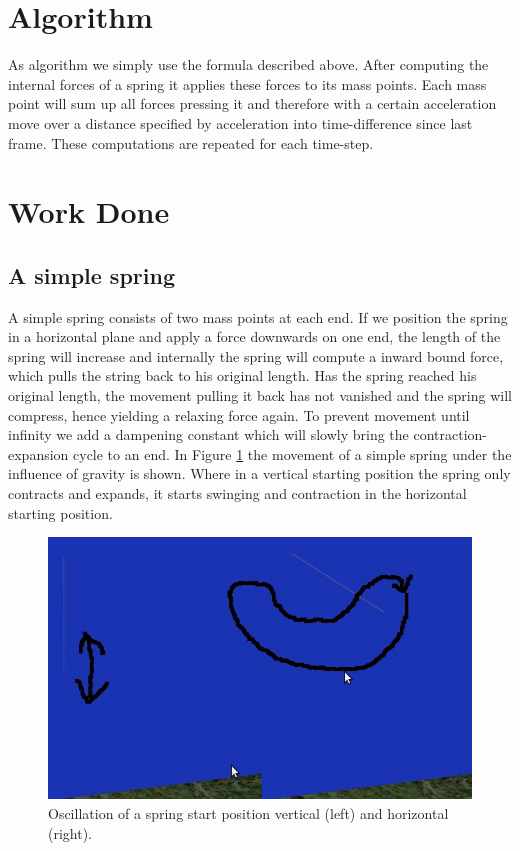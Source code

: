 \documentclass[11pt]{article}
\begin{document}
\section{Algorithm}
As algorithm we simply use the formula described above. After computing the internal forces of a spring it applies these forces to its mass points. Each mass point will sum up all forces pressing it and therefore with a certain acceleration move over a distance specified by acceleration into time-difference since last frame. These computations are repeated for each time-step.

\section{Work Done}
\subsection{A simple spring}
A simple spring consists of two mass points at each end. If we position the spring in a horizontal plane and apply a force downwards on one end, the length of the spring will increase and internally the spring will compute a inward bound force, which pulls the string back to his original length. Has the spring reached his original length, the movement pulling it back has not vanished and the spring will compress, hence yielding a relaxing force again. To prevent movement until infinity we add a dampening constant which will slowly bring the contraction-expansion cycle to an end. In Figure \ref{fig:spring-oszi} the movement of a simple spring under the influence of gravity is shown. Where in a vertical starting position the spring only contracts and expands, it starts swinging and contraction in the horizontal starting position.

\begin{figure}[h]
\centering
\includegraphics[scale=0.4]{spring-oszi.jpg}
\caption{Oscillation of a spring start position vertical (left) and horizontal (right).}
\label{fig:spring-oszi}
\end{figure}
\end{document}
